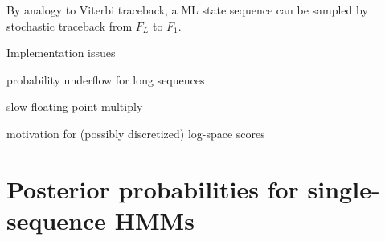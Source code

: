 \documentclass{beamer}
\begin{document}
\begin{frame}{}
By analogy to Viterbi traceback, a ML state sequence can be sampled by
stochastic traceback from $F_L$ to $F_1$.
\item Implementation issues
 \itemb
 \item probability underflow for long sequences
 \item slow floating-point multiply
 \item motivation for (possibly discretized) log-space scores
 \iteme
\iteme

\end{frame}

\section{Posterior probabilities for single-sequence HMMs}

\begin{frame}{}


\end{frame}
\end{document}
